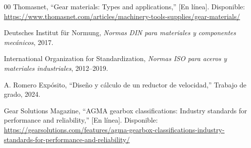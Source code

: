 \documentclass[conference]{IEEEtran}
\begin{document}
\begin{thebibliography}{00}
Thomasnet, ``Gear materials: Types and applications,'' [En línea].
Disponible:
\url{https://www.thomasnet.com/articles/machinery-tools-supplies/gear-materials/}

Deutsches Institut für Normung, \textit{Normas DIN para materiales y componentes
mecánicos}, 2017.

International Organization for Standardization, \textit{Normas ISO para aceros y
materiales industriales}, 2012--2019.

A. Romero Expósito, ``Diseño y cálculo de un reductor de velocidad,'' Trabajo de grado,
2024.

Gear Solutions Magazine, ``AGMA gearbox classifications: Industry standards for
performance and reliability,'' [En línea].
Disponible:
\url{https://gearsolutions.com/features/agma-gearbox-classifications-industry-standards-for-performance-and-reliability/}

\end{thebibliography}
\end{document}
